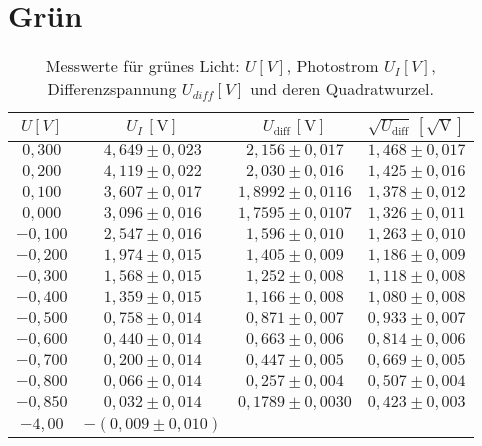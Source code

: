 \newpage

\section{Grün}
\begin{table}[h!]
    \centering
    \begin{tabular}{cccc}
    \hline
    $U [V]$ & $U_I \, [\mathrm{V}]$ & $U_{\text{diff}} \, [\mathrm{V}]$ & $\sqrt{U_{\text{diff}}} \, [\mathrm{\sqrt{V}}]$ \\
    \hline
    $0,300$ & $4,649 \pm 0,023$ & $2,156 \pm 0,017$ & $1,468 \pm 0,017$ \\
    $0,200$ & $4,119 \pm 0,022$ & $2,030 \pm 0,016$ & $1,425 \pm 0,016$ \\
    $0,100$ & $3,607 \pm 0,017$ & $1,8992 \pm 0,0116$ & $1,378 \pm 0,012$ \\
    $0,000$ & $3,096 \pm 0,016$ & $1,7595 \pm 0,0107$ & $1,326 \pm 0,011$ \\
    $-0,100$ & $2,547 \pm 0,016$ & $1,596 \pm 0,010$ & $1,263 \pm 0,010$ \\
    $-0,200$ & $1,974 \pm 0,015$ & $1,405 \pm 0,009$ & $1,186 \pm 0,009$ \\
    $-0,300$ & $1,568 \pm 0,015$ & $1,252 \pm 0,008$ & $1,118 \pm 0,008$ \\
    $-0,400$ & $1,359 \pm 0,015$ & $1,166 \pm 0,008$ & $1,080 \pm 0,008$ \\
    $-0,500$ & $0,758 \pm 0,014$ & $0,871 \pm 0,007$ & $0,933 \pm 0,007$ \\
    $-0,600$ & $0,440 \pm 0,014$ & $0,663 \pm 0,006$ & $0,814 \pm 0,006$ \\
    $-0,700$ & $0,200 \pm 0,014$ & $0,447 \pm 0,005$ & $0,669 \pm 0,005$ \\
    $-0,800$ & $0,066 \pm 0,014$ & $0,257 \pm 0,004$ & $0,507 \pm 0,004$ \\
    $-0,850$ & $0,032 \pm 0,014$ & $0,1789 \pm 0,0030$ & $0,423 \pm 0,003$ \\
    $-4,00$ & $-(0,009 \pm 0,010)$ & & \\
    \hline
    \end{tabular}
    \caption{Messwerte für grünes Licht: $U [V]$, Photostrom $U_I [V]$, Differenzspannung $U_{diff} [V]$ und deren Quadratwurzel.}
    \label{tab:gruen_values}
\end{table}

\newpage

